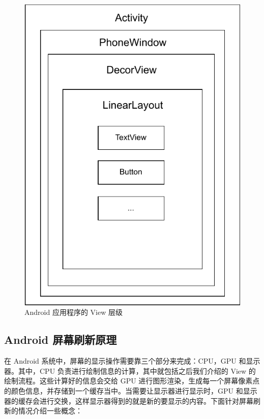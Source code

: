 \begin{figure}
    \centering
    \includegraphics[scale=0.7]{assets/view-hierarchy.pdf}
    \caption{Android 应用程序的 View 层级}
\end{figure}

\subsection{Android 屏幕刷新原理}

在 Android 系统中，屏幕的显示操作需要靠三个部分来完成：CPU，GPU 和显示器。其中，CPU 负责进行绘制信息的计算，其中就包括之后我们介绍的 View 的绘制流程。这些计算好的信息会交给 GPU 进行图形渲染，生成每一个屏幕像素点的颜色信息，并存储到一个缓存当中。当需要让显示器进行显示时，GPU 和显示器的缓存会进行交换，这样显示器得到的就是新的要显示的内容。下面针对屏幕刷新的情况介绍一些概念：

